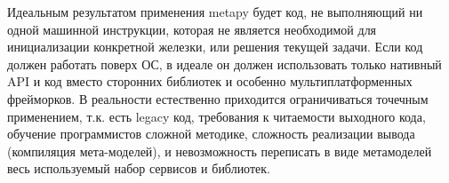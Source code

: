 Идеальным результатом применения metapy будет код, не выполняющий ни одной
машинной инструкции, которая не является необходимой для инициализации
конкретной железки, или решения текущей задачи. Если код должен работать поверх
ОС, в идеале он должен использовать только нативный API и
 код
вместо сторонних библиотек и особенно мультиплатформенных фрейморков. В
реальности естественно приходится ограничиваться точечным применением, т.к. есть
legacy код, требования к читаемости выходного кода, обучение программистов
сложной методике, сложность реализации вывода (компиляция мета-моделей), и
невозможность переписать в виде метамоделей весь используемый набор сервисов и
библиотек.

